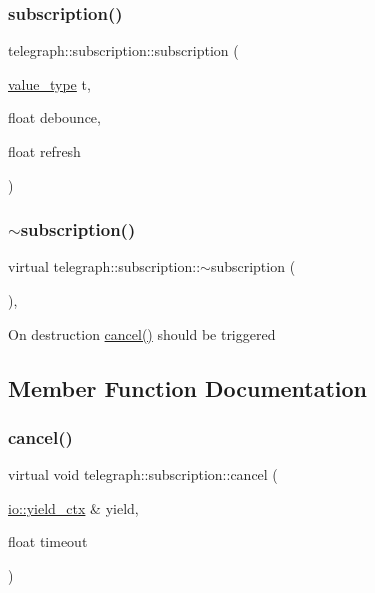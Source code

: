 \subsubsection{\texorpdfstring{subscription()}{subscription()}}
{\footnotesize\ttfamily telegraph\+::subscription\+::subscription (\begin{DoxyParamCaption}\item[{\hyperlink{classtelegraph_1_1value__type}{value\+\_\+type}}]{t,  }\item[{float}]{debounce,  }\item[{float}]{refresh }\end{DoxyParamCaption})\hspace{0.3cm}{\ttfamily [inline]}}

\mbox{\label{classtelegraph_1_1subscription_a8a9cf662e9a068514d9595d9df0a48ca}} 
\subsubsection{\texorpdfstring{$\sim$subscription()}{~subscription()}}
{\footnotesize\ttfamily virtual telegraph\+::subscription\+::$\sim$subscription (\begin{DoxyParamCaption}{ }\end{DoxyParamCaption})\hspace{0.3cm}{\ttfamily [inline]}, {\ttfamily [virtual]}}

On destruction \hyperlink{classtelegraph_1_1subscription_aa4917994240c530af2fd0e2a5bff435c}{cancel()} should be triggered 

\subsection{Member Function Documentation}
\mbox{\label{classtelegraph_1_1subscription_ae8efc1bddc19862bf79ea2659e3ae980}} 
\subsubsection{\texorpdfstring{cancel()}{cancel()}\hspace{0.1cm}{\footnotesize\ttfamily [1/2]}}
{\footnotesize\ttfamily virtual void telegraph\+::subscription\+::cancel (\begin{DoxyParamCaption}\item[{\hyperlink{structboost_1_1asio_1_1yield__ctx}{io\+::yield\+\_\+ctx} \&}]{yield,  }\item[{float}]{timeout }\end{DoxyParamCaption})\hspace{0.3cm}{\ttfamily [pure virtual]}}

